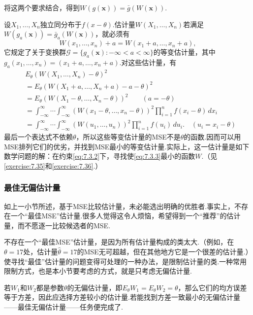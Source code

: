 将这两个要求结合，得到$W(g(\boldsymbol x))=\bar g(W(\boldsymbol x))$.
\begin{example}[等变估计量的MSE]\label{ex:7.3.6}
设$X_1,\ldots,X_n$独立同分布于$f(x-\theta)$.估计量$W(X_1,\ldots,X_n)$若满足$W(g_a(\boldsymbol x))=\bar g_a(W(\boldsymbol x))$，就必须有
\begin{equation}\label{eq:7.3.2}
W(x_1,\ldots,x_n)+a=W(x_1+a,\ldots,x_n+a),
\end{equation}
它规定了关于变换群$\mathcal G=\{g_a(\boldsymbol x):-\infty<a<\infty\}$的等变估计量，其中$g_a(x_1,\ldots,x_n)=(x_1+a,\ldots,x_n+a)$.对这些估计量，有
\begin{equation}\label{eq:7.3.3}
\begin{aligned}
&E_\theta(W(X_1,\ldots,X_n)-\theta)^2\\
&=E_\theta(W(X_1+a,\ldots,X_n+a)-a-\theta)^2\\
&=E_\theta(W(X_1-\theta,\ldots,X_n-\theta))^2\qquad(a=-\theta)\\
&=\int_{-\infty}^\infty\cdots\int_{-\infty}^\infty(W(x_1-\theta,\ldots,x_n-\theta))^2\prod_{i=1}^nf(x_i-\theta)\,dx_i\\
&=\int_{-\infty}^\infty\cdots\int_{-\infty}^\infty(W(u_1,\ldots,u_n))^2\prod_{i=1}^nf(u_i)\,du_i.\quad(u_i=x_i-\theta)
\end{aligned}
\end{equation}
最后一个表达式不依赖$\theta$，所以这些等变估计量的MSE不是$\theta$的函数.因而可以用MSE排列它们的优劣，并找到MSE最小的等变估计量.实际上，这一估计量是如下数学问题的解：在约束\eqref{eq:7.3.2}下，寻找使\eqref{eq:7.3.3}最小的函数$W$.（见\autoref{exercise:7.35}和\autoref{exercise:7.36}.）
\end{example}
\subsubsection{最佳无偏估计量}\label{sec:7.3.2}
如上一小节所述，基于MSE比较估计量，未必能选出明确的优胜者.事实上，不存在一个“最佳MSE”估计量.很多人觉得这令人烦恼，希望得到一个“推荐”的估计量，而不愿逐一比较候选者的MSE.

不存在一个“最佳MSE”估计量，是因为所有估计量构成的类太大.（例如，在$\theta=17$处，估计量$\widehat\theta=17$的MSE无可超越，但在其他地方它是一个很差的估计量.）使寻找“最佳”估计量的问题变得可处理的一种办法，是限制估计量的类.一种常用限制方式，也是本小节要考虑的方式，就是只考虑无偏估计量.

若$W_1$和$W_2$都是参数$\theta$的无偏估计量，即$E_\theta W_1=E_\theta W_2=\theta$，那么它们的均方误差等于方差，因此应选择方差较小的估计量.若能找到方差一致最小的无偏估计量——最佳无偏估计量——任务便完成了.

